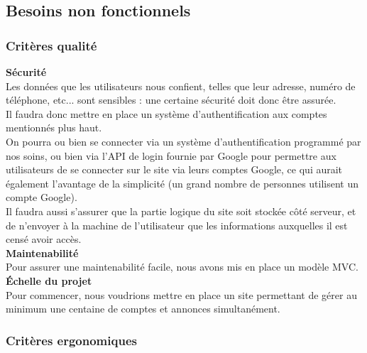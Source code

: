 \documentclass[a4paper,11pt]{article}
\begin{document}

\subsection{Besoins non fonctionnels}

\subsubsection{Critères qualité}

\textbf{Sécurité}\\

Les données que les utilisateurs nous confient, telles que leur adresse, numéro de téléphone, etc... sont
sensibles : une certaine sécurité doit donc être assurée.\\

Il faudra donc mettre en place un système d'authentification aux comptes mentionnés plus haut.\\

On pourra ou bien se connecter via un système d'authentification programmé par nos soins, ou bien via l'API de login fournie par Google pour permettre aux utilisateurs de se connecter sur le site via leurs comptes Google, ce qui aurait également l'avantage de la simplicité (un grand nombre de personnes utilisent un compte Google).\\

Il faudra aussi s'assurer que la partie logique du site soit stockée côté serveur, et de n'envoyer à la machine de l'utilisateur que les informations auxquelles il est censé avoir accès.\\

\textbf{Maintenabilité}\\

Pour assurer une maintenabilité facile, nous avons mis en place un modèle MVC.\\


\textbf{Échelle du projet}\\

Pour commencer, nous voudrions mettre en place un site permettant de gérer au minimum une centaine de comptes et annonces simultanément.\\

\subsubsection{Critères ergonomiques}
\end{document}
